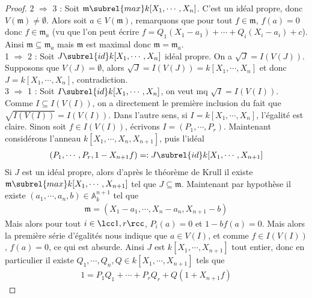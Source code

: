             \begin{proof}
                2 $\Rightarrow$ 3 : Soit $\mathfrak{m} \subrel{max} k[X_1, \cdots, X_n]$. C'est un idéal propre, donc $V(\mathfrak{m}) \neq \emptyset$. Alors soit $a \in V(\mathfrak{m})$, remarquons que pour tout $f \in \mathfrak{m}$, $f(a) = 0$ donc $f \in \mathfrak{m}_a$ (vu que l'on peut écrire $f = Q_1(X_1 - a_1) + \cdots + Q_i(X_i - a_i) + c$). Ainsi $\mathfrak{m} \subseteq \mathfrak{m}_a$ mais $\mathfrak{m}$ est maximal donc $\mathfrak{m} = \mathfrak{m}_a$.\\
                1 $\Rightarrow$ 2 : Soit $J \subrel{id} k[X_1, \cdots, X_n]$ idéal propre. On a $\sqrt{J} = I(V(J))$. Supposons que $V(J) = \emptyset$, alors $\sqrt{J} = I(V(J)) = k[X_1, \cdots, X_n]$ et donc $J = k[X_1, \cdots, X_n]$, contradiction.\\
                3 $\Rightarrow$ 1 : Soit $I \subrel{id} k[X_1, \cdots, X_n]$, on veut mq $\sqrt{I} = I(V(I))$. Comme $I \subseteq I(V(I))$, on a directement le première inclusion du fait que $\sqrt{I(V(I))} = I(V(I))$. Dans l'autre sens, si $I = k[X_1, \cdots, X_n]$, l'égalité est claire. Sinon soit $f \in I(V(I))$, écrivons $I = (P_1, \cdots, P_r)$. Maintenant considérons l'anneau $k[X_1, \cdots, X_n, X_{n+1}]$, puis l'idéal
                \begin{align*}
                    (P_1, \cdots, P_r, 1 - X_{n+1}f) =: J \subrel{id} k[X_1, \cdots, X_{n+1}]
                \end{align*}
                Si $J$ est un idéal propre, alors d'après le théorème de Krull il existe $\mathfrak{m} \subrel{max} k[X_1, \cdots, X_{n+1}]$ tel que $J \subseteq \mathfrak{m}$. Maintenant par hypothèse il existe $(a_1, \cdots, a_n, b) \in \mathbb{A}_k^{n+1}$ tel que
                \begin{align*}
                    \mathfrak{m} = (X_1 - a_1, \cdots, X_n - a_n, X_{n+1} - b)
                \end{align*}
                Mais alors pour tout $i \in \lcc 1,r \rcc$, $P_i(a) = 0$ et $1 - bf(a) = 0$. Mais alors la première série d'égalités nous indique que $a \in V(I)$, et comme $f \in I(V(I))$, $f(a) = 0$, ce qui est absurde. Ainsi $J$ est $k[X_1, \cdots, X_{n+1}]$ tout entier, donc en particulier il existe $Q_1, \cdots, Q_n, Q \in k[X_1, \cdots, X_{n+1}]$ tels que
                \label{1.1}
                \begin{align}
                    1 = P_1Q_1 + \cdots + P_rQ_r + Q(1 + X_{n+1}f)
                \end{align}

\end{proof}
